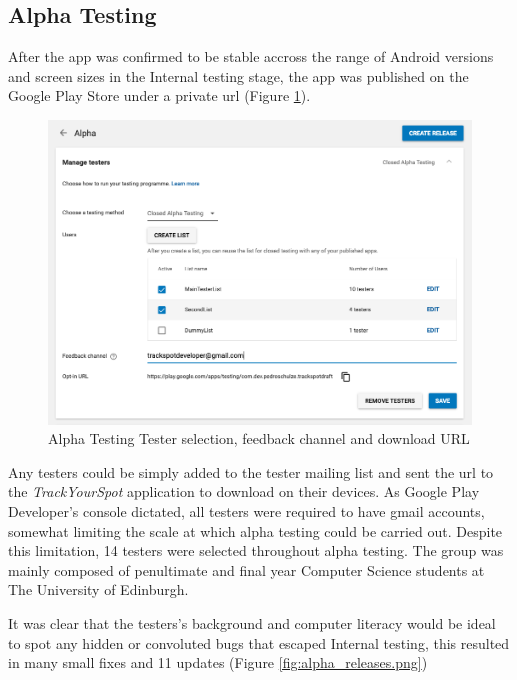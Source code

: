 \subsection{Alpha Testing}
After the app was confirmed to be stable accross the range of Android versions and screen sizes in the Internal testing stage, the app was published on the Google Play Store under a private url (Figure \ref{fig:alpha_testers.png}).
\begin{figure}[H]
    \includegraphics[width=1.2\textwidth, center]{figures/alpha_testers.png}
    \caption{Alpha Testing Tester selection, feedback channel and download URL}
    \label{fig:alpha_testers.png}
\end{figure}
Any testers could be simply added to the tester mailing list and sent the url to the \emph{TrackYourSpot} application to download on their devices. As Google Play Developer's console dictated, all testers were required to have gmail accounts, somewhat limiting the scale at which alpha testing could be carried out. Despite this limitation, 14 testers were selected throughout alpha testing. The group was mainly composed of penultimate and final year Computer Science students at The University of Edinburgh.
\par It was clear that the testers's background and computer literacy would be ideal to spot any hidden or convoluted bugs that escaped Internal testing, this resulted in many small fixes and 11 updates (Figure \ref{fig:alpha_releases.png})
